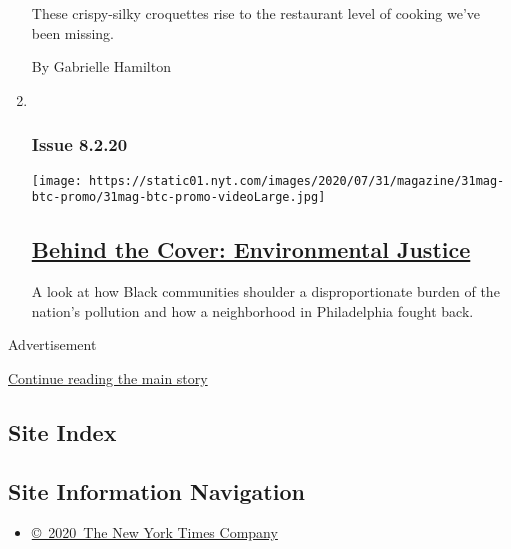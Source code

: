 \begin{enumerate}
  These crispy-silky croquettes rise to the restaurant level of cooking
  we've been missing.

  By Gabrielle Hamilton
\item ~
  \hypertarget{issue-8220}{%
  \subsubsection{Issue 8.2.20}\label{issue-8220}}

  \texttt{[image: https://static01.nyt.com/images/2020/07/31/magazine/31mag-btc-promo/31mag-btc-promo-videoLarge.jpg]}

  \hypertarget{behind-the-cover-environmental-justice}{%
  \subsection{\texorpdfstring{\href{/2020/07/31/magazine/behind-the-cover-environmental-justice.html}{Behind
  the Cover: Environmental
  Justice}}{Behind the Cover: Environmental Justice}}\label{behind-the-cover-environmental-justice}}

  A look at how Black communities shoulder a disproportionate burden of
  the nation's pollution and how a neighborhood in Philadelphia fought
  back.
\end{enumerate}

Advertisement

\protect\hyperlink{after-mid1}{Continue reading the main story}

\hypertarget{site-index}{%
\subsection{Site Index}\label{site-index}}

\hypertarget{site-information-navigation}{%
\subsection{Site Information
Navigation}\label{site-information-navigation}}

\begin{itemize}
\tightlist
\item
  \href{https://help.nytimes.com/hc/en-us/articles/115014792127-Copyright-notice}{©~2020~The
  New York Times Company}
\end{itemize}

